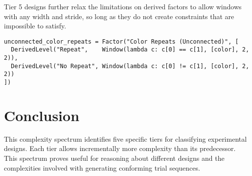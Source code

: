 Tier 5 designs further relax the limitations on derived factors to allow windows with any width and stride, so long as they do not create constraints that are impossible to satisfy.

\begin{verbatim}
unconnected_color_repeats = Factor("Color Repeats (Unconnected)", [
  DerivedLevel("Repeat",    Window(lambda c: c[0] == c[1], [color], 2, 2)),
  DerivedLevel("No Repeat", Window(lambda c: c[0] != c[1], [color], 2, 2))
])
\end{verbatim}

\section{Conclusion}

This complexity spectrum identifies five specific tiers for classifying experimental designs. Each tier allows incrementally more complexity than its predecessor. This spectrum proves useful for reasoning about different designs and the complexities involved with generating conforming trial sequences.
